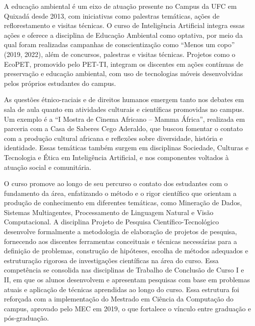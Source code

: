A educação ambiental é um eixo de atuação presente no Campus da UFC em Quixadá desde 2013, com iniciativas como palestras temáticas, ações de reflorestamento e visitas técnicas. O curso de Inteligência Artificial integra essas ações e oferece a disciplina de Educação Ambiental como optativa, por meio da qual foram realizadas campanhas de conscientização como “Menos um copo” (2019, 2022), além de concursos, palestras e visitas técnicas. Projetos como o EcoPET, promovido pelo PET-TI, integram os discentes em ações contínuas de preservação e educação ambiental, com uso de tecnologias móveis desenvolvidas pelos próprios estudantes do campus.

As questões étnico-raciais e de direitos humanos emergem tanto nos debates em sala de aula quanto em atividades culturais e científicas promovidas no campus. Um exemplo é a “I Mostra de Cinema Africano – Mamma África”, realizada em parceria com a Casa de Saberes Cego Aderaldo, que buscou fomentar o contato com a produção cultural africana e reflexões sobre diversidade, história e identidade. Essas temáticas também surgem em disciplinas Sociedade, Culturas e Tecnologia e Ética em Inteligência Artificial, e nos componentes voltados à atuação social e comunitária.


O curso promove ao longo de seu percurso o contato dos estudantes com o fundamento da área, enfatizando o método e o rigor científico que orientam a produção de conhecimento em diferentes temáticas, como Mineração de Dados, Sistemas Multiagentes, Processamento de Linguagem Natural e Visão Computacional. A disciplina Projeto de Pesquisa Científico-Tecnológico desenvolve formalmente a metodologia de elaboração de projetos de pesquisa, fornecendo aos discentes ferramentas conceituais e técnicas necessárias para a definição de problemas, construção de hipóteses, escolha de métodos adequados e estruturação rigorosa de investigações científicas na área do curso. Essa competência se consolida nas disciplinas de Trabalho de Conclusão de Curso I e II, em que os alunos desenvolvem e apresentam pesquisas com base em problemas atuais e aplicação de técnicas aprendidas ao longo do curso. Essa estrutura foi reforçada com a implementação do Mestrado em Ciência da Computação do campus, aprovado pelo MEC em 2019, o que fortalece o vínculo entre graduação e pós-graduação.

